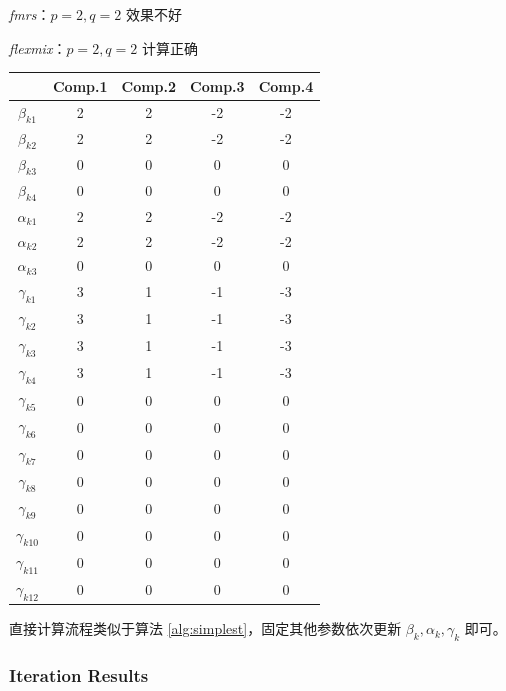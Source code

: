 \documentclass[12pt, a4paper, oneside]{article}
\numberwithin{equation}{section}
\begin{document}
\textit{fmrs}：$p=2,q=2$ 效果不好

\textit{flexmix}：$p=2,q=2$ 计算正确

\begin{table}[h]
	\centering
	\begin{tabular}{ccccc}
		\toprule
		& Comp.1 & Comp.2 & Comp.3 & Comp.4 \\
		\midrule
		$\beta_{k1}$   & 2      & 2      & -2     & -2     \\
		$\beta_{k2}$   & 2      & 2      & -2     & -2     \\
		$\beta_{k3}$   & 0      & 0      & 0      & 0      \\
		$\beta_{k4}$   & 0      & 0      & 0      & 0      \\
		\midrule
		$\alpha_{k1}$  & 2      & 2      & -2     & -2     \\
		$\alpha_{k2}$  & 2      & 2      & -2     & -2     \\
		$\alpha_{k3}$  & 0      & 0      & 0      & 0      \\
		\midrule
		$\gamma_{k1}$  & 3      & 1      & -1     & -3     \\
		$\gamma_{k2}$  & 3      & 1      & -1     & -3     \\
		$\gamma_{k3}$  & 3      & 1      & -1     & -3     \\
		$\gamma_{k4}$  & 3      & 1      & -1     & -3     \\
		$\gamma_{k5}$  & 0      & 0      & 0      & 0      \\
		$\gamma_{k6}$  & 0      & 0      & 0      & 0      \\
		$\gamma_{k7}$  & 0      & 0      & 0      & 0      \\
		$\gamma_{k8}$  & 0      & 0      & 0      & 0      \\
		$\gamma_{k9}$  & 0      & 0      & 0      & 0      \\
		$\gamma_{k10}$ & 0      & 0      & 0      & 0      \\
		$\gamma_{k11}$ & 0      & 0      & 0      & 0      \\
		$\gamma_{k12}$ & 0      & 0      & 0      & 0     \\
		\bottomrule
	\end{tabular}
	\label{tb:coef_true}
\end{table}

直接计算流程类似于算法 \ref{alg:simplest}，固定其他参数依次更新 $\beta_k, \alpha_k, \gamma_k$ 即可。

\subsubsection{Iteration Results}
\end{document}
